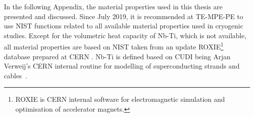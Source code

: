 
In the following Appendix, the material properties used in this thesis are presented and discussed. Since July 2019, it is recommended at TE-MPE-PE to use NIST functions related to all available material properties used in cryogenic studies. Except for the volumetric heat capacity of Nb-Ti, which is not available, all material properties are based on NIST taken from an update ROXIE\footnote{ROXIE is CERN internal software for electromagnetic simulation and optimisation of accelerator magnets.} database prepared at CERN \cite{material_properties_roxie}. Nb-Ti is defined based on CUDI being Arjan Verweij's CERN internal routine for modelling of superconducting strands and cables~\cite{cudi_manual}.